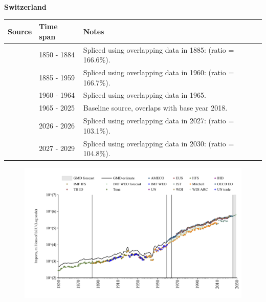 \documentclass[12pt,a4paper,landscape]{article}
\begin{document}
\begin{adjustbox}{max totalsize={\paperwidth}{\paperheight},center}
\begin{minipage}[t][\textheight][t]{\textwidth}
\vspace*{0.5cm}
{}
\begin{center}
{\Large\bfseries Switzerland}
\end{center}
\vspace{0.5cm}
\begin{table}[H]
\centering
\small
\begin{tabular}{|l|l|l|}
\hline
\textbf{Source} & \textbf{Time span} & \textbf{Notes} \\
\hline
\rowcolor{white}\cite{Tena}& 1850 - 1884 &Spliced using overlapping data in 1885: (ratio = 166.6\%).\\
\rowcolor{lightgray}\cite{JST}& 1885 - 1959 &Spliced using overlapping data in 1960: (ratio = 166.7\%).\\
\rowcolor{white}\cite{AMECO}& 1960 - 1964 &Spliced using overlapping data in 1965.\\
\rowcolor{lightgray}\cite{OECD_EO}& 1965 - 2025 &Baseline source, overlaps with base year 2018.\\
\rowcolor{white}\cite{AMECO}& 2026 - 2026 &Spliced using overlapping data in 2027: (ratio = 103.1\%).\\
\rowcolor{lightgray}\cite{IMF_WEO_forecast}& 2027 - 2029 &Spliced using overlapping data in 2030: (ratio = 104.8\%).\\
\hline
\end{tabular}
\end{table}
\begin{figure}[H]
\centering
\includegraphics[width=\textwidth,height=0.6\textheight,keepaspectratio]{graphs/CHE_imports.pdf}
\end{figure}
\end{minipage}
\end{adjustbox}
\end{document}
